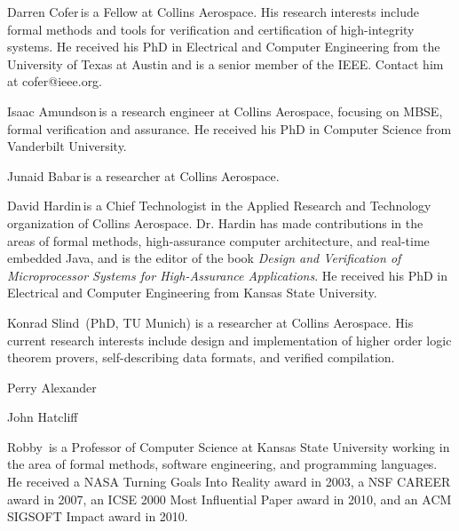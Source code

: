 \begin{IEEEbiography}{Darren Cofer}{\,}is a Fellow at Collins Aerospace. His research interests include formal methods and tools for verification and certification of high-integrity systems. He received his PhD in Electrical and Computer Engineering from the University of Texas at Austin and is a senior member of the IEEE. Contact him at cofer@ieee.org.
\end{IEEEbiography}

\begin{IEEEbiography}{Isaac Amundson}{\,}is a research engineer at Collins Aerospace, focusing on MBSE, formal verification and assurance.  He received his PhD in Computer Science from Vanderbilt University.
\end{IEEEbiography}

\begin{IEEEbiography}{Junaid Babar}{\,}is a researcher at Collins Aerospace.
\end{IEEEbiography}

\begin{IEEEbiography}{David Hardin}{\,}is a Chief Technologist in the Applied Research and Technology organization of Collins Aerospace.  Dr. Hardin has made contributions in the areas of formal methods, high-assurance computer architecture, and real-time embedded Java, and is the editor of the book \emph{Design and Verification of Microprocessor Systems for High-Assurance Applications}.  He received his PhD in Electrical and Computer Engineering from Kansas State University.
\end{IEEEbiography}

\begin{IEEEbiography}{Konrad Slind}{\,} (PhD, TU Munich) is a researcher at Collins Aerospace.
  His current research interests include design and implementation of
  higher order logic theorem provers, self-describing data formats,
  and verified compilation.
\end{IEEEbiography}

\begin{IEEEbiography}{Perry Alexander}{\,}
\end{IEEEbiography}

\begin{IEEEbiography}{John Hatcliff}{\,}
\end{IEEEbiography}

\begin{IEEEbiography}{Robby}{\,}
is a Professor of Computer Science at Kansas State University working
in the area of formal methods, software engineering, and programming
languages.
He received a NASA Turning Goals Into Reality award in 2003,
a NSF CAREER award in 2007, an ICSE 2000 Most Influential Paper award in 2010,
and an ACM SIGSOFT Impact award in 2010.
\end{IEEEbiography}

